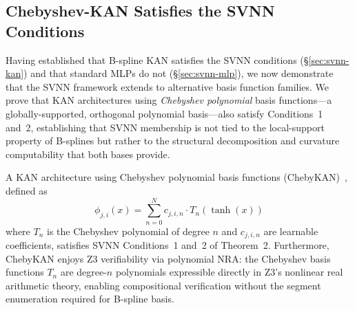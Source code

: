 
\subsection{Chebyshev-KAN Satisfies the SVNN Conditions}
\label{sec:svnn-chebykan}

Having established that B-spline KAN satisfies the SVNN conditions
({\S}\ref{sec:svnn-kan}) and that standard MLPs do not
({\S}\ref{sec:svnn-mlp}), we now demonstrate that the SVNN framework
extends to alternative basis function families. We prove that KAN
architectures using \textit{Chebyshev polynomial} basis functions---a
globally-supported, orthogonal polynomial basis---also satisfy Conditions~1
and~2, establishing that SVNN membership is not tied to the local-support
property of B-splines but rather to the structural decomposition and
curvature computability that both bases provide.

\vspace{4pt}
\begin{proposition}
\label{prop:chebykan-svnn}
A KAN architecture using Chebyshev polynomial basis functions
(ChebyKAN)~\cite{bozorgasl2024chebykan}, defined as
\begin{equation}
\phi_{j,i}(x) = \sum_{n=0}^{N} c_{j,i,n} \cdot T_n(\tanh(x))
\label{eq:chebykan_def}
\end{equation}
where $T_n$ is the Chebyshev polynomial of degree $n$ and $c_{j,i,n}$ are
learnable coefficients, satisfies SVNN Conditions~1 and~2 of Theorem~2.
Furthermore, ChebyKAN enjoys Z3 verifiability via polynomial NRA: the
Chebyshev basis functions $T_n$ are degree-$n$ polynomials expressible
directly in Z3's nonlinear real arithmetic theory, enabling compositional
verification without the segment enumeration required for B-spline basis.
\end{proposition}

